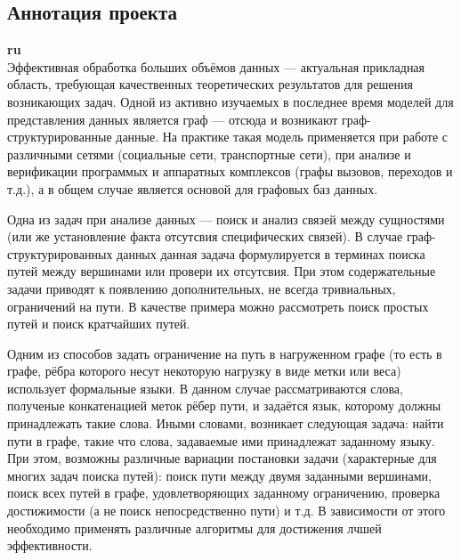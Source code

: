 \documentclass[12pt]{article}  %
\theoremstyle{remark}
\begin{document}
\subsection{Аннотация проекта}
\textbf{ru}\\
%
Эффективная обработка больших объёмов данных --- актуальная прикладная область, требующая качественных теоретических результатов для решения возникающих задач.
Одной из активно изучаемых в последнее время моделей для представления данных является граф --- отсюда и возникают граф-структурированные данные.
На практике такая модель применяется при работе с различными сетями (социальные сети, транспортные сети), при анализе и верификации программых и аппаратных комплексов (графы вызовов, переходов и т.д.), а в общем случае является основой для графовых баз данных.

Одна из задач при анализе данных --- поиск и анализ связей между сущностями (или же установление факта отсутсвия специфических связей).
В случае граф-структурированных данных данная задача формулируется в терминах поиска путей между вершинами или провери их отсутсвия.
При этом содержательные задачи приводят к появлению дополнительных, не всегда тривиальных, ограничений на пути.
В качестве примера можно рассмотреть поиск простых путей и поиск кратчайших путей.

Одним из способов задать ограничение на путь в нагруженном графе (то есть в графе, рёбра которого несут некоторую нагрузку в виде метки или веса) использует формальные языки.
В данном случае рассматриваются слова, полученые конкатенацией меток рёбер пути, и задаётся язык, которому должны принадлежать такие слова.
Иными словами, возникает следующая задача: найти пути в графе, такие что слова, задаваемые ими принадлежат заданному языку.
При этом, возможны различные вариации постановки задачи (характерные для многих задач поиска путей): поиск пути между двумя заданными вершинами, поиск всех путей в графе, удовлетворяющих заданному ограничению, проверка достижимости (а не поиск непосредственно пути) и т.д.
В зависимости от этого необходимо применять различные алгоритмы для достижения лчшей эффективности.
\end{document}
